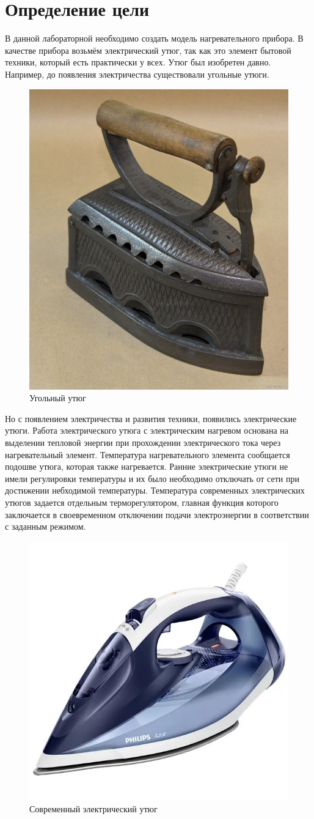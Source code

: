 \documentclass[a4paper, 14pt]{extarticle}
\begin{document}
	\pagebreak	

	\section{Определение цели}
		В данной лабораторной необходимо создать модель нагревательного прибора. В качестве прибора возьмём электрический утюг, так как это элемент бытовой техники, который есть практически у всех. Утюг был изобретен давно. Например, до появления электричества существовали угольные утюги.	
		
		\begin{figure}[H]
			\centering
			\includegraphics[width = .5\linewidth]{utug0.jpg}
			\caption[.] {Угольный утюг}
		\end{figure}
		
 		Но с появлением электричества и развития техники, появились электрические утюги. Работа электрического утюга с электрическим нагревом основана на выделении тепловой энергии при прохождении электрического тока через нагревательный элемент. Температура нагревательного элемента сообщается подошве утюга, которая также нагревается. Ранние электрические утюги не имели регулировки температуры и их было необходимо отключать от сети при достижении небходимой температуры. Температура современных электрических утюгов задается отдельным терморегулятором, главная функция которого заключается в своевременном отключении подачи электроэнергии в соответствии с заданным режимом.
		
		\begin{figure}[H]
			\centering
			\includegraphics[width = .5\linewidth]{utug.jpg}
			\caption[.] {Современный электрический утюг}
		\end{figure}
	
\end{document}

